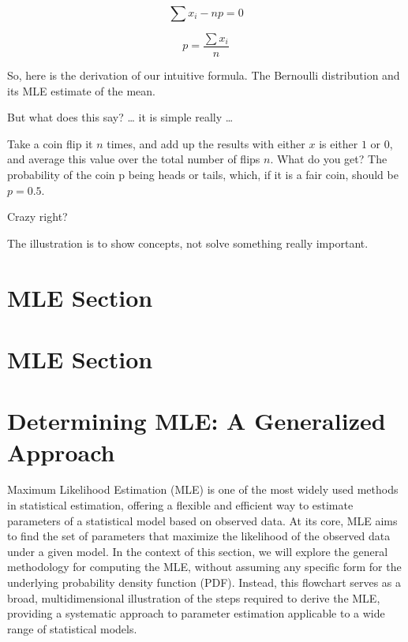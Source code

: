 \documentclass[
  12 pt,
  a4paper,
]{book}
\numberwithin{equation}{section}
\theoremstyle{plain}      %
\theoremstyle{definition} %
\theoremstyle{remark}     %
\theoremstyle{note}         %
\begin{document}
\[
\sum x_{i}-n p=0
\]

\[
p=\frac{\sum x_{i}}{n}
\]

So, here is the derivation of our intuitive formula. The Bernoulli
distribution and its MLE estimate of the mean.

But what does this say? \ldots{} it is simple really \ldots{}

Take a coin flip it \(n\) times, and add up the results with either
\(x\) is either \(1\) or \(0\), and average this value over the total
number of flips \(n\). What do you get? The probability of the coin p
being heads or tails, which, if it is a fair coin, should be
\(p = 0.5\).

Crazy right?

The illustration is to show concepts, not solve something really
important.

\newpage

\newpage

\hypertarget{mle-section}{%
\section{MLE Section}\label{mle-section}}

\newpage

\hypertarget{mle-section-1}{%
\section{MLE Section}\label{mle-section-1}}

\newpage

\hypertarget{determining-mle-a-generalized-approach}{%
\section{Determining MLE: A Generalized
Approach}\label{determining-mle-a-generalized-approach}}

Maximum Likelihood Estimation (MLE) is one of the most widely used
methods in statistical estimation, offering a flexible and efficient way
to estimate parameters of a statistical model based on observed data. At
its core, MLE aims to find the set of parameters that maximize the
likelihood of the observed data under a given model. In the context of
this section, we will explore the general methodology for computing the
MLE, without assuming any specific form for the underlying probability
density function (PDF). Instead, this flowchart serves as a broad,
multidimensional illustration of the steps required to derive the MLE,
providing a systematic approach to parameter estimation applicable to a
wide range of statistical models.
\end{document}
